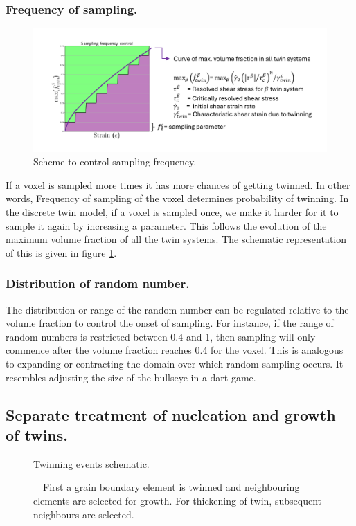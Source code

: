 \subsubsection{Frequency of sampling.}

 \begin{figure}[H]
    \centering
    \includegraphics[width=\textwidth]{images/Sampling_parameter.pdf}
    \caption{Scheme to control sampling frequency.}
    \label{Sampling_frequency}
\end{figure}

 If a voxel is sampled more times it has more chances of getting twinned. In other words, Frequency of sampling of the voxel determines probability of twinning. In the discrete twin model, if a voxel is sampled once, we make it harder for it to sample it again by increasing a parameter. This follows the evolution of the maximum volume fraction of all the twin systems. The schematic representation of this is given in figure \ref{Sampling_frequency}.
 
\subsubsection{Distribution of random number.}
 The distribution or range of the random number can be regulated relative to the volume fraction to control the onset of sampling. For instance, if the range of random numbers is restricted between 0.4 and 1, then sampling will only commence after the volume fraction reaches 0.4 for the voxel. This is analogous to expanding or contracting the domain over which random sampling occurs. It resembles adjusting the size of the bullseye in a dart game.

\subsection{Separate treatment of nucleation and growth of twins.}

\begin{figure}
    \centering 
    \resizebox{0.4\textwidth}{!}{
    }
    \caption{Twinning events schematic.}
    \caption*{\ \ First a grain boundary element is twinned and neighbouring elements are selected for growth. For thickening of twin, subsequent neighbours are selected.}
    \label{fig:Twinning_events}
\end{figure}

